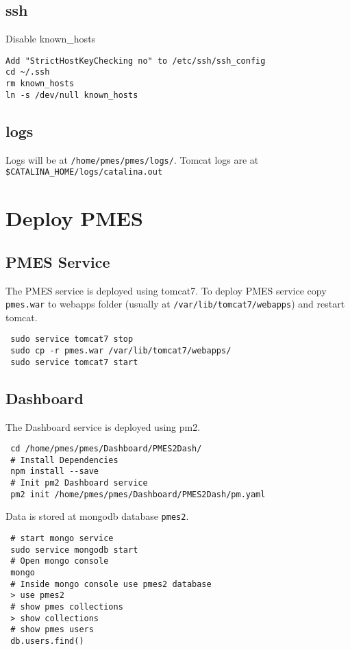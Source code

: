 \documentclass[a4paper,10pt]{article}
\begin{document}
\subsection{ssh}
Disable known\_hosts
\begin{verbatim}
Add "StrictHostKeyChecking no" to /etc/ssh/ssh_config
cd ~/.ssh
rm known_hosts
ln -s /dev/null known_hosts
\end{verbatim}

\subsection{logs}
Logs will be at \texttt{/home/pmes/pmes/logs/}. Tomcat logs are at \texttt{\$CATALINA\_HOME/logs/catalina.out}
\section{Deploy PMES}
\subsection{PMES Service}
The PMES service is deployed using tomcat7. To deploy PMES service copy \texttt{pmes.war} to webapps folder (usually at \texttt{/var/lib/tomcat7/webapps}) and restart tomcat.

\begin{verbatim}
 sudo service tomcat7 stop
 sudo cp -r pmes.war /var/lib/tomcat7/webapps/
 sudo service tomcat7 start
\end{verbatim}


\subsection{Dashboard}
The Dashboard service is deployed using pm2.\\
\begin{verbatim}
 cd /home/pmes/pmes/Dashboard/PMES2Dash/
 # Install Dependencies
 npm install --save
 # Init pm2 Dashboard service
 pm2 init /home/pmes/pmes/Dashboard/PMES2Dash/pm.yaml
\end{verbatim}

Data is stored at mongodb database \texttt{pmes2}.
\begin{verbatim}
 # start mongo service
 sudo service mongodb start
 # Open mongo console
 mongo
 # Inside mongo console use pmes2 database
 > use pmes2
 # show pmes collections
 > show collections
 # show pmes users
 db.users.find()
 
\end{verbatim}
\end{document}
